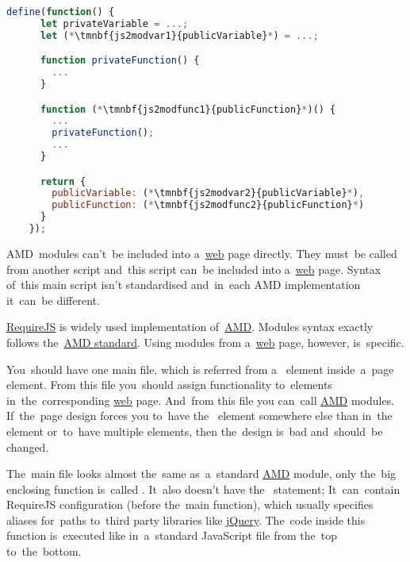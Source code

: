 \enlargethispage{10mm}
\begin{lstlisting}[language=JavaScript]
    define(function() {
      let privateVariable = ...;
      let (*\tmnbf{js2modvar1}{publicVariable}*) = ...;

      function privateFunction() {
        ...
      }

      function (*\tmnbf{js2modfunc1}{publicFunction}*)() {
        ...
        privateFunction();
        ...
      }

      return {
        publicVariable: (*\tmnbf{js2modvar2}{publicVariable}*),
        publicFunction: (*\tmnbf{js2modfunc2}{publicFunction}*)
      }
    });
\end{lstlisting}
\newpage

AMD~modules can't~be included into a~\hyperref[internetweb]{web} page directly.
They must~be called from another script and~this script can~be included into a~\hyperref[internetweb]{web} page.
Syntax of~this main script isn't standardised and~in~each AMD implementation it~can~be different.

\label{requirejs}
\href{https://requirejs.org}{RequireJS} is widely used implementation of~\hyperref[amd]{AMD}.
Modules syntax exactly follows the~\hyperref[amdsyntax]{AMD standard}.
Using modules from a~\hyperref[internetweb]{web} page, however, is~specific.

You~should have one main file, which is referred from a~ element inside~a~page  element.
From this file you~should assign functionality to~elements in~the~corresponding \hyperref[internetweb]{web} page.
And~from this file you can~call \hyperref[amd]{AMD} modules.
If~the~page design forces you to~have the~ element somewhere else than in~the~ element or~to~have multiple  elements, then the~design is~bad and~should~be changed.

The~main file looks almost the~same as~a~standard \hyperref[amd]{AMD} module, only the~big enclosing function is~called .
It~also doesn't have the~ statement;
It~can~contain RequireJS configuration (before the~main  function), which usually specifies aliases for~paths to~third party libraries like \hyperref[jquery]{jQuery}.
The~code inside this function is~executed like in~a~standard JavaScript file from the~top to~the~bottom.

